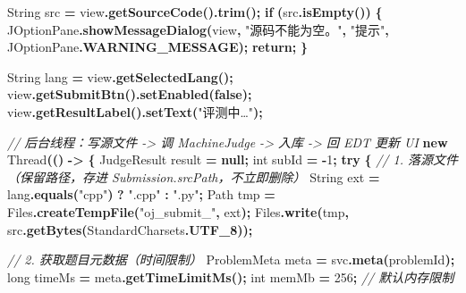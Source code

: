 \documentclass[
  11pt,
]{ctexart}
\newenvironment{Shaded}{\begin{snugshade}}{\end{snugshade}}
\newcommand{\BuiltInTok}[1]{#1}
\newcommand{\CommentTok}[1]{\textcolor[rgb]{0.56,0.35,0.01}{\textit{#1}}}
\newcommand{\ControlFlowTok}[1]{\textcolor[rgb]{0.13,0.29,0.53}{\textbf{#1}}}
\newcommand{\DataTypeTok}[1]{\textcolor[rgb]{0.13,0.29,0.53}{#1}}
\newcommand{\DecValTok}[1]{\textcolor[rgb]{0.00,0.00,0.81}{#1}}
\newcommand{\FunctionTok}[1]{\textcolor[rgb]{0.13,0.29,0.53}{\textbf{#1}}}
\newcommand{\KeywordTok}[1]{\textcolor[rgb]{0.13,0.29,0.53}{\textbf{#1}}}
\newcommand{\NormalTok}[1]{#1}
\newcommand{\OperatorTok}[1]{\textcolor[rgb]{0.81,0.36,0.00}{\textbf{#1}}}
\newcommand{\StringTok}[1]{\textcolor[rgb]{0.31,0.60,0.02}{#1}}
\begin{document}
\begin{Shaded}
\begin{Highlighting}[]
        \BuiltInTok{String}\NormalTok{ src }\OperatorTok{=}\NormalTok{ view}\OperatorTok{.}\FunctionTok{getSourceCode}\OperatorTok{().}\FunctionTok{trim}\OperatorTok{();}
        \ControlFlowTok{if} \OperatorTok{(}\NormalTok{src}\OperatorTok{.}\FunctionTok{isEmpty}\OperatorTok{())} \OperatorTok{\{}
            \BuiltInTok{JOptionPane}\OperatorTok{.}\FunctionTok{showMessageDialog}\OperatorTok{(}\NormalTok{view}\OperatorTok{,} \StringTok{"源码不能为空。"}\OperatorTok{,}
                \StringTok{"提示"}\OperatorTok{,} \BuiltInTok{JOptionPane}\OperatorTok{.}\FunctionTok{WARNING\_MESSAGE}\OperatorTok{);}
            \ControlFlowTok{return}\OperatorTok{;}
        \OperatorTok{\}}

        \BuiltInTok{String}\NormalTok{ lang }\OperatorTok{=}\NormalTok{ view}\OperatorTok{.}\FunctionTok{getSelectedLang}\OperatorTok{();}
\NormalTok{        view}\OperatorTok{.}\FunctionTok{getSubmitBtn}\OperatorTok{().}\FunctionTok{setEnabled}\OperatorTok{(}\KeywordTok{false}\OperatorTok{);}
\NormalTok{        view}\OperatorTok{.}\FunctionTok{getResultLabel}\OperatorTok{().}\FunctionTok{setText}\OperatorTok{(}\StringTok{"评测中…"}\OperatorTok{);}

        \CommentTok{// 后台线程：写源文件 {-}\textgreater{} 调 MachineJudge {-}\textgreater{} 入库 {-}\textgreater{} 回 EDT 更新 UI}
        \KeywordTok{new} \BuiltInTok{Thread}\OperatorTok{(()} \OperatorTok{{-}\textgreater{}} \OperatorTok{\{}
\NormalTok{            JudgeResult result }\OperatorTok{=} \KeywordTok{null}\OperatorTok{;}
            \DataTypeTok{int}\NormalTok{ subId }\OperatorTok{=} \OperatorTok{{-}}\DecValTok{1}\OperatorTok{;}
            \ControlFlowTok{try} \OperatorTok{\{}
                \CommentTok{// 1. 落源文件（保留路径，存进 Submission.srcPath，不立即删除）}
                \BuiltInTok{String}\NormalTok{ ext }\OperatorTok{=}\NormalTok{ lang}\OperatorTok{.}\FunctionTok{equals}\OperatorTok{(}\StringTok{"cpp"}\OperatorTok{)} \OperatorTok{?} \StringTok{".cpp"} \OperatorTok{:} \StringTok{".py"}\OperatorTok{;}
\NormalTok{                Path   tmp }\OperatorTok{=}\NormalTok{ Files}\OperatorTok{.}\FunctionTok{createTempFile}\OperatorTok{(}\StringTok{"oj\_submit\_"}\OperatorTok{,}\NormalTok{ ext}\OperatorTok{);}
\NormalTok{                Files}\OperatorTok{.}\FunctionTok{write}\OperatorTok{(}\NormalTok{tmp}\OperatorTok{,}\NormalTok{ src}\OperatorTok{.}\FunctionTok{getBytes}\OperatorTok{(}\NormalTok{StandardCharsets}\OperatorTok{.}\FunctionTok{UTF\_8}\OperatorTok{));}

                \CommentTok{// 2. 获取题目元数据（时间限制）}
\NormalTok{                ProblemMeta meta }\OperatorTok{=}\NormalTok{ svc}\OperatorTok{.}\FunctionTok{meta}\OperatorTok{(}\NormalTok{problemId}\OperatorTok{);}
                \DataTypeTok{long}\NormalTok{ timeMs }\OperatorTok{=}\NormalTok{ meta}\OperatorTok{.}\FunctionTok{getTimeLimitMs}\OperatorTok{();}
                \DataTypeTok{int}\NormalTok{  memMb  }\OperatorTok{=} \DecValTok{256}\OperatorTok{;}   \CommentTok{// 默认内存限制}


\end{Highlighting}
\end{Shaded}
\end{document}
